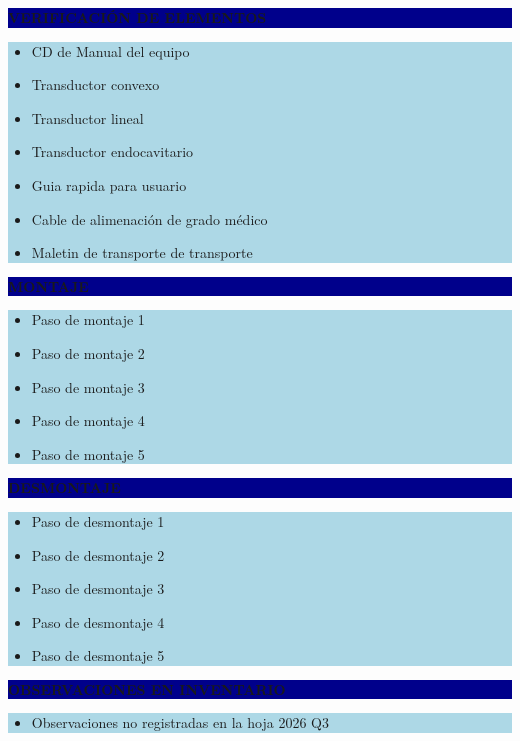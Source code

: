 \documentclass[11pt]{article}
\newcommand{\seccionbanda}[1]{%
  \vspace{0.6em}
  \noindent\colorbox{darkblue}{\parbox{\dimexpr\linewidth-2\fboxsep}{%
    \centering\color{white}\bfseries #1}}\par\vspace{0.6em}
}
\begin{document}
\newpage
\seccionbanda{VERIFICACIÓN DE ELEMENTOS}
\noindent\colorbox{lightblue}{\parbox{\dimexpr\linewidth-2\fboxsep\relax}{%
\begin{itemize}[label=$\square$, itemsep=4pt]
\item CD de Manual del equipo
\item Transductor convexo
\item Transductor lineal
\item Transductor endocavitario
\item Guia rapida para usuario
\item Cable de alimenación de grado médico
\item Maletin de transporte de transporte
\end{itemize}
}}\par

\seccionbanda{MONTAJE}
\noindent\colorbox{lightblue}{\parbox{\dimexpr\linewidth-2\fboxsep\relax}{%
\begin{itemize}[label=$\square$, itemsep=4pt]
\item Paso de montaje 1
\item Paso de montaje 2
\item Paso de montaje 3
\item Paso de montaje 4
\item Paso de montaje 5
\end{itemize}
}}\par

\seccionbanda{DESMONTAJE}
\noindent\colorbox{lightblue}{\parbox{\dimexpr\linewidth-2\fboxsep\relax}{%
\begin{itemize}[label=$\square$, itemsep=4pt]
\item Paso de desmontaje 1
\item Paso de desmontaje 2
\item Paso de desmontaje 3
\item Paso de desmontaje 4
\item Paso de desmontaje 5
\end{itemize}
}}\par
\seccionbanda{OBSERVACIONES EN INVENTARIO}
\noindent\colorbox{lightblue}{\parbox{\dimexpr\linewidth-2\fboxsep\relax}{\begin{itemize}[itemsep=4pt]
\item Observaciones no registradas en la hoja 2026 Q3
\end{itemize}}}\par
\end{document}
